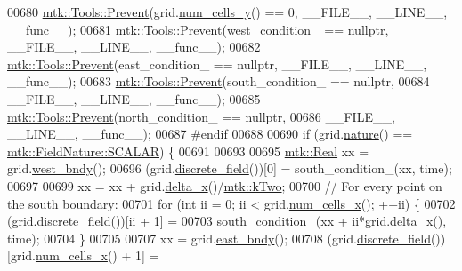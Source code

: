 \begin{DoxyCode}
00680   \hyperlink{classmtk_1_1Tools_a332324c6f25e66be9dff48c5987a3b9f}{mtk::Tools::Prevent}(grid.\hyperlink{classmtk_1_1UniStgGrid2D_aed05a801cc9a76dba0ff203cea58a61a}{num\_cells\_y}() == 0, \_\_FILE\_\_, \_\_LINE\_\_, \_\_func\_\_);
00681   \hyperlink{classmtk_1_1Tools_a332324c6f25e66be9dff48c5987a3b9f}{mtk::Tools::Prevent}(west\_condition\_ == \textcolor{keyword}{nullptr}, \_\_FILE\_\_, \_\_LINE\_\_, \_\_func\_\_);
00682   \hyperlink{classmtk_1_1Tools_a332324c6f25e66be9dff48c5987a3b9f}{mtk::Tools::Prevent}(east\_condition\_ == \textcolor{keyword}{nullptr}, \_\_FILE\_\_, \_\_LINE\_\_, \_\_func\_\_);
00683   \hyperlink{classmtk_1_1Tools_a332324c6f25e66be9dff48c5987a3b9f}{mtk::Tools::Prevent}(south\_condition\_ == \textcolor{keyword}{nullptr},
00684                       \_\_FILE\_\_, \_\_LINE\_\_, \_\_func\_\_);
00685   \hyperlink{classmtk_1_1Tools_a332324c6f25e66be9dff48c5987a3b9f}{mtk::Tools::Prevent}(north\_condition\_ == \textcolor{keyword}{nullptr},
00686                       \_\_FILE\_\_, \_\_LINE\_\_, \_\_func\_\_);
00687 \textcolor{preprocessor}{  #endif}
00688 
00690   \textcolor{keywordflow}{if} (grid.\hyperlink{classmtk_1_1UniStgGrid2D_a99a3a9cdb05b7306be99bde935509e30}{nature}() == \hyperlink{namespacemtk_ga4c54f2a329cfb4e56213b02a259d19e2a8f3d9a4b6a7b7f2c7afa61ca113d0db9}{mtk::FieldNature::SCALAR}) \{
00691 
00693 
00695     \hyperlink{group__c01-roots_gac080bbbf5cbb5502c9f00405f894857d}{mtk::Real} xx = grid.\hyperlink{classmtk_1_1UniStgGrid2D_af2b1712387ded85edaf2b64617d3fc13}{west\_bndy}();
00696     (grid.\hyperlink{classmtk_1_1UniStgGrid2D_a3e72d59843a3f9c5e47da07e5850dfe0}{discrete\_field}())[0] = south\_condition\_(xx, time);
00697 
00699     xx = xx + grid.\hyperlink{classmtk_1_1UniStgGrid2D_aca4710004c4a7da6a9e8fd6ab32a691f}{delta\_x}()/\hyperlink{group__c01-roots_gaf39c2d851a2db744f4feb1c5ab3ec2cf}{mtk::kTwo};
00700     \textcolor{comment}{// For every point on the south boundary:}
00701     \textcolor{keywordflow}{for} (\textcolor{keywordtype}{int} ii = 0; ii < grid.\hyperlink{classmtk_1_1UniStgGrid2D_a2d182866a398aba8e4829590e85bf939}{num\_cells\_x}(); ++ii) \{
00702       (grid.\hyperlink{classmtk_1_1UniStgGrid2D_a3e72d59843a3f9c5e47da07e5850dfe0}{discrete\_field}())[ii + 1] =
00703         south\_condition\_(xx + ii*grid.\hyperlink{classmtk_1_1UniStgGrid2D_aca4710004c4a7da6a9e8fd6ab32a691f}{delta\_x}(), time);
00704     \}
00705 
00707     xx = grid.\hyperlink{classmtk_1_1UniStgGrid2D_a03f689eb29a6369b82ce1207c655d5ff}{east\_bndy}();
00708     (grid.\hyperlink{classmtk_1_1UniStgGrid2D_a3e72d59843a3f9c5e47da07e5850dfe0}{discrete\_field}())[grid.\hyperlink{classmtk_1_1UniStgGrid2D_a2d182866a398aba8e4829590e85bf939}{num\_cells\_x}() + 1] =

\end{DoxyCode}
